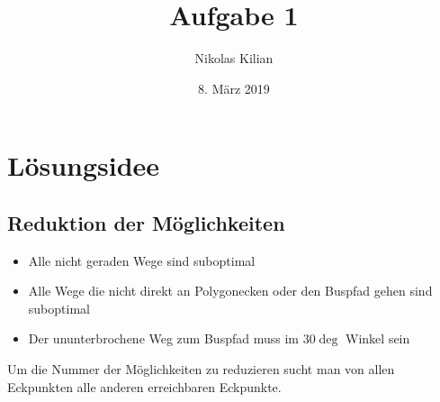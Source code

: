 \documentclass[12pt]{article}
\title{\vspace{-2.0cm}Aufgabe 1}
\author{Nikolas Kilian}
\date{8. März 2019}
\begin{document}
\maketitle

\section{Lösungsidee}
\subsection{Reduktion der Möglichkeiten}
\begin{itemize}
\item Alle nicht geraden Wege sind suboptimal\\
\item Alle Wege die nicht direkt an Polygonecken oder den Buspfad gehen sind suboptimal\\
\item Der ununterbrochene Weg zum Buspfad muss im 30$\deg$ Winkel sein\\
\end{itemize}
Um die Nummer der Möglichkeiten zu reduzieren sucht man von allen Eckpunkten alle anderen erreichbaren Eckpunkte.
\end{document}
